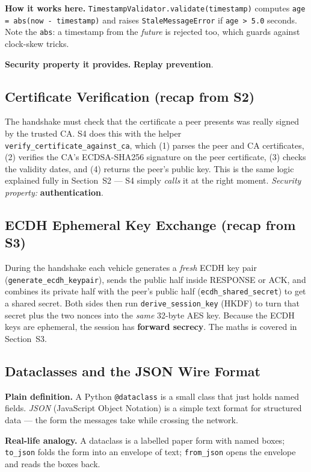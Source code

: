 \documentclass[11pt,a4paper]{article}
\begin{document}
\textbf{How it works here.} \texttt{TimestampValidator.validate(timestamp)}
computes \texttt{age = abs(now - timestamp)} and raises \texttt{StaleMessageError}
if \texttt{age > 5.0} seconds. Note the \texttt{abs}: a timestamp from the
\emph{future} is rejected too, which guards against clock-skew tricks.

\textbf{Security property it provides.} \textbf{Replay prevention}.

\subsection{Certificate Verification (recap from S2)}
The handshake must check that the certificate a peer presents was really signed
by the trusted CA. S4 does this with the helper
\texttt{verify\_certificate\_against\_ca}, which (1) parses the peer and CA
certificates, (2) verifies the CA's ECDSA-SHA256 signature on the peer
certificate, (3) checks the validity dates, and (4) returns the peer's public
key. This is the same logic explained fully in Section~S2 ---
S4 simply \emph{calls} it at the right moment. \emph{Security property:}
\textbf{authentication}.

\subsection{ECDH Ephemeral Key Exchange (recap from S3)}
During the handshake each vehicle generates a \emph{fresh} ECDH key pair
(\texttt{generate\_ecdh\_keypair}), sends the public half inside RESPONSE or ACK,
and combines its private half with the peer's public half
(\texttt{ecdh\_shared\_secret}) to get a shared secret. Both sides then run
\texttt{derive\_session\_key} (HKDF) to turn that secret plus the two nonces into
the \emph{same} 32-byte AES key. Because the ECDH keys are ephemeral, the session
has \textbf{forward secrecy}. The maths is covered in Section~S3.

\subsection{Dataclasses and the JSON Wire Format}
\textbf{Plain definition.} A Python \texttt{@dataclass} is a small class that
just holds named fields. \emph{JSON} (JavaScript Object Notation) is a simple
text format for structured data --- the form the messages take while crossing
the network.

\textbf{Real-life analogy.} A dataclass is a labelled paper form with named
boxes; \texttt{to\_json} folds the form into an envelope of text; \texttt{from\_json}
opens the envelope and reads the boxes back.
\end{document}
